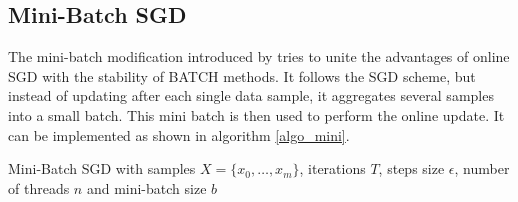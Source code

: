\documentclass{acm_proc_article-sp}
\begin{document}
\subsection{Mini-Batch SGD}\label{sec_minisgd}
The mini-batch modification introduced by \cite{sculley2010web}
tries to unite the advantages of online SGD with the stability of BATCH
methods. It follows the SGD scheme, but instead of updating after each single
data sample, it aggregates several samples into a small batch. This mini
batch is then used to perform the online update.   
It can be implemented as shown in algorithm \ref{algo_mini}.
\begin{algorithm}
\caption{Mini-Batch SGD 
with samples $X=\{x_0,\dots,x_m\}$, iterations $T$, steps size
$\epsilon$, number of threads $n$ and mini-batch size $b$}
\label{algo_mini}
\begin{algorithmic}[1]
\EndFor
{}

\EndFor
{}

\end{algorithmic}
\end{algorithm}
\end{document}
